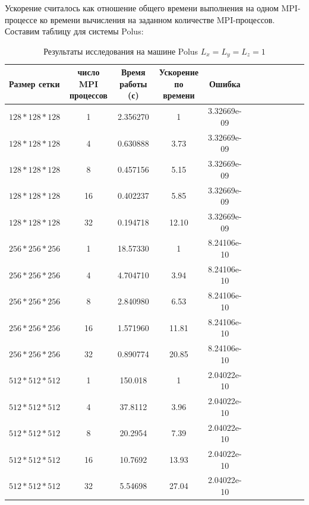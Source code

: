 \documentclass{article}
\begin{document}
    Ускорение считалось как отношение общего времени выполнения 
    на одном MPI-процессе ко времени вычисления на заданном количестве MPI-процессов.
    Составим таблицу для системы Polus:
    \begin{table}[!t]
        \centering
        \caption{Результаты исследования на машине Polus \(L_x = L_y = L_z = 1\)}\label{tab:tab1}
        \begin{tabularx}{\textwidth}{@{}l*{10}{C}c@{}} %
            \toprule
            \bf Размер сетки & \bf число MPI процессов  & \bf Время работы (с) & \bf Ускорение по времени & \bf Ошибка \\
                \midrule
                \(128*128*128\) & 1  & 2.356270 & 1     & 3.32669e-09\\
                \(128*128*128\) & 4  & 0.630888 & 3.73  & 3.32669e-09\\
                \(128*128*128\) & 8  & 0.457156 & 5.15  & 3.32669e-09\\
                \(128*128*128\) & 16 & 0.402237 & 5.85  & 3.32669e-09\\
                \(128*128*128\) & 32 & 0.194718 & 12.10 & 3.32669e-09\\
                \midrule
                \(256*256*256\) & 1  & 18.57330 & 1     & 8.24106e-10 \\
                \(256*256*256\) & 4  & 4.704710 & 3.94  & 8.24106e-10 \\
                \(256*256*256\) & 8  & 2.840980 & 6.53  & 8.24106e-10 \\
                \(256*256*256\) & 16 & 1.571960 & 11.81 & 8.24106e-10 \\
                \(256*256*256\) & 32 & 0.890774 & 20.85 & 8.24106e-10 \\
                \midrule
                \(512*512*512\) & 1  & 150.018 & 1      & 2.04022e-10 \\
                \(512*512*512\) & 4  & 37.8112 & 3.96   & 2.04022e-10 \\
                \(512*512*512\) & 8  & 20.2954 & 7.39   & 2.04022e-10 \\
                \(512*512*512\) & 16 & 10.7692 & 13.93  & 2.04022e-10 \\
                \(512*512*512\) & 32 & 5.54698 & 27.04  & 2.04022e-10 \\
                \bottomrule
            \end{tabularx}
        \end{table}
\end{document}
